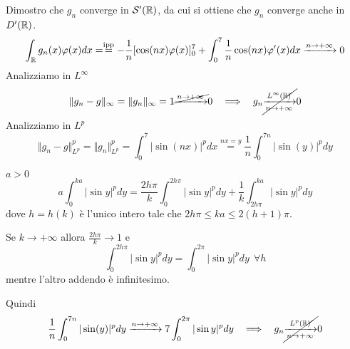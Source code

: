 Dimostro che $g_{n}$ converge in $\mathcal{S}  '(\mathbb{R})$, da cui si ottiene che $g_{n}$ converge anche in $D'(\mathbb{R})$.
\begin{equation*}
\int _{\mathbb{R} } g_{n}(x) \varphi (x) dx = \overset{\text{ipp}}{ = } - \frac{1}{n}[\cos(nx) \varphi (x)]^{7}_{0} + \int ^{7}_{0}\frac{1}{n}\cos(nx) \varphi '(x) dx\xrightarrow{n\rightarrow + \infty } 0
\end{equation*}
Analizziamo in $L^{\infty }$
\begin{equation*}
\Vert g_{n} - g\Vert _{\infty } = \Vert g_{n}\Vert _{\infty } = 1\cancel{\xrightarrow{n\rightarrow + \infty }} 0\ \ \implies \ \ g_{n}\cancel{\xrightarrow[n\rightarrow + \infty ]{L^{\infty }(\mathbb{R})}} 0
\end{equation*}
Analizziamo in $L^{p}$
\begin{equation*}
\Vert g_{n} - g\Vert ^{p}_{L^{p}} = \Vert g_{n}\Vert ^{p}_{L^{p}} = \int ^{7}_{0}| \sin(nx)| ^{p} dx\overset{nx = y}{ = }\frac{1}{n}\int ^{7n}_{0}| \sin(y)| ^{p} dy
\end{equation*}
\begin{rem}
$a > 0$
\begin{equation*}
a\int ^{ka}_{0}| \sin y| ^{p} dy = \frac{2h\pi }{k}\int ^{2h\pi }_{0}| \sin y| ^{p} dy + \frac{1}{k}\int ^{ka}_{2h\pi }| \sin y| ^{p} dy
\end{equation*}
dove $h = h(k)$ è l'unico intero tale che $2h\pi \leqslant ka\leqslant 2(h + 1) \pi $.

Se $k\rightarrow + \infty $ allora $\frac{2h\pi }{k}\rightarrow 1$ e
\begin{equation*}
\int ^{2h\pi }_{0}| \sin y| ^{p} dy = \int ^{2\pi }_{0}| \sin y| ^{p} dy\ \ \forall h
\end{equation*}
mentre l'altro addendo è infinitesimo.
\end{rem}
Quindi
\begin{equation*}
\frac{1}{n}\int ^{7n}_{0}| \sin(y)| ^{p} dy\xrightarrow{n\rightarrow + \infty } 7\int ^{2\pi }_{0}| \sin y| ^{p} dy\ \ \implies \ \ g_{n}\cancel{\xrightarrow[n\rightarrow + \infty ]{L^{p}(\mathbb{R})}} 0
\end{equation*}
\Soluzione
